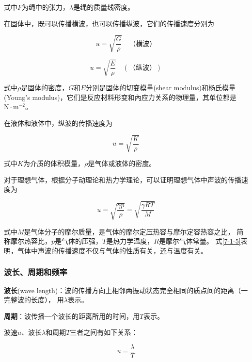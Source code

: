 \documentclass[12pt, a4paper]{article}
\numberwithin{equation}{section}
\begin{document}
    式中\(F \)为绳中的张力，\(\lambda\)是绳的质量线密度。

    在固体中，既可以传播横波，也可以传播纵波，它们的传播速度分别为

    \begin{equation}
        u=\sqrt{\frac{G}{\rho}} \quad \text{（横波）}
    \end{equation}

    \begin{equation}
        u=\sqrt{\frac{E}{\rho}} \quad(\text{（纵波）})
    \end{equation}
    
    式中\(\rho\)是固体的密度，\(G\)和\(E\)分别是固体的切变模量(shear modulus)和杨氏模量\\
    (Young's modulus)，它们是反应材料形变和內应力关系的物理量，其单位都是\(\mathrm{N \cdot m^{-2}}\)。

    在液体和液体中，纵波的传播速度为

    \begin{equation}
        u=\sqrt{\frac{K}{\rho}}
    \end{equation}

    式中\(K\)为介质的体积模量，\(\rho\)是气体或液体的密度。

    对于理想气体，根据分子动理论和热力学理论，可以证明理想气体中声波的传播速度为

    \begin{equation}
        u=\sqrt{\frac{\gamma p}{\rho}}=\sqrt{\frac{\gamma R T}{M}}
        \label{7-1-5}
    \end{equation}

    式中\(M\)是气体分子的摩尔质量，是气体的摩尔定压热容与摩尔定容热容之比，
    简称摩尔热容比，\(p\)是气体的压强，\(T\)是热力学温度，\(R \)是摩尔气体常量。
    式\ref{7-1-5}表明，气体中声波的传播速度不仅与气体的性质有关，还与温度有关。

\subsubsection{波长、周期和频率}

    \textbf{波长}(wave length)：波的传播方向上相邻两振动状态完全相同的质点间的距离（一完整波的长度），
    用\(\lambda\)表示。

    \textbf{周期}：波传播一个波长的距离所用的时间，用\(T \)表示。

    波速\(u \)、波长\(\lambda\)和周期\(T \)三者之间有如下关系：

    \begin{equation}
        u=\frac{\lambda}{T}
        \label{7-1-6}
    \end{equation}
\end{document}
